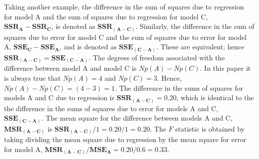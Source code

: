 \documentclass[11pt, oneside]{article}   	%
\begin{document}
\vspace{2 mm}

Taking another example, the difference in the sum of squares due to regression for model A and the sum of squares due to regression for model C, $  \mathbf{SSR_{A}} -  \mathbf{SSR_{C}} $, is denoted as $  \mathbf{SSR_{(A-C)}}  $.  Similarly, the difference in the sum of squares due to error for model C and the sum of squares due to error for model A, $  \mathbf{SSE_{C}} -  \mathbf{SSE_{A}}   $, and is denoted as $ \mathbf{ SSE_{(C-A)}}   $. These are equivalent; hence $   \mathbf{SSR_{(A-C)}}  =  \mathbf{ SSE_{(C-A)}}   $.  The degrees of freedom associated with the difference between model A and model C is $  Np(A) - Np(C)  $.  In this paper it is always true that $  Np(A) = 4 $ and $  Np(C) = 3  $.  Hence,  $  Np(A) - Np(C)   =  (4 - 3) =  1$.  The difference in the sums of squares for models A and C due to regression is $ \mathbf{SSR_{(A-C)}}  = 0.20 $, which is identical to the the difference in the sums of squares due to error for models A and C, $  \mathbf{SSE_{(C-A)}} $. The mean square for the difference between models A and C, $ \mathbf{MSR_{(A-C)}}  $ is $ \mathbf{SSR_{(A-C)}} / 1 = 0.20/1 = 0.20 $.  The $ F  $ statistic is obtained by taking dividing the mean square due to regression by the mean square for error for model A, $ \mathbf{MSR_{(A-C)}} / \mathbf{MSE_{A}} = 0.20 / 0.6 = 0.33 $.     
\end{document}
